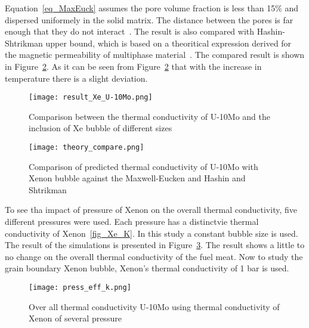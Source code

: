 \begin{doublespacing}
Equation~\ref{eq_MaxEuck} assumes the pore volume fraction is less than 15$\%$ and dispersed uniformely in the solid matrix. The distance between the pores is far enough that they do not interact~\cite{clark2003monolithic,smith2013thermal}. The result is also compared with  Hashin-Shtrikman upper bound, which is based on a theoritical expression derived for the magnetic permeability of multiphase material~\cite{hashin1962variational}. The compared result is shown in Figure~\ref{fig_compare}. As it can be seen from Figure~\ref{fig_compare} that with the increase in temperature there is a slight deviation.

\begin{figure}[H]
\centering
\texttt{[image: result\_Xe\_U-10Mo.png]}
\caption{Comparison between the thermal conductivity of U-10Mo and the inclusion of Xe bubble of different sizes}
\label{fig_result}
\end{figure}

\iffalse
FEM calculations were performed on \ref{fcc_mesh} in order to calculate the thermal flux and the thermal conductivity in 2D. Since thermal conductivity of Xenon is a function of both temperature and pressure, six different pressure has been chosen to represend the conductivity (Figure~\ref{fig_Xe_K}). Eventhough the dependence of thermal conductivity is evident, the results show no change in the overall thermal conductivity in the fuel. Pressure in the bubble is significantly higher than the 1000 bar in some situation~\cite{xiao2015atomistic}. The increased pressure inside the bubble creates another probability of having phase change from gas to solid~\cite{zheng2014thermodynamics}. So the resluts show that with the increased pressure inside the Xenon bubble, the overall thermal conductivity has a very negligible effect. 
\fi

\begin{figure}[H]
	\centering
	\texttt{[image: theory\_compare.png]}
	\caption{Comparison of predicted thermal conductivity of U-10Mo with Xenon bubble against the Maxwell-Eucken and Hashin and Shtrikman }
	\label{fig_compare}
	\end{figure}
To see tha impact of pressure of Xenon on the overall thermal conductivity, five different pressures were used. Each pressure has a distinctvie thermal conductivity of Xenon~\ref{fig_Xe_K}. In this study a constant bubble size is used. The result of the simulations is presented in Figure~\ref{fig_press_K}. The result shows a little to no change on the overall thermal conductivity of the fuel meat. Now to study the grain boundary Xenon bubble, Xenon's thermal conductivity of 1 bar is used.


\begin{figure}[H]
	\centering
	\texttt{[image: press\_eff\_k.png]}
	\caption{Over all thermal conductivity U-10Mo using thermal conductivity of Xenon of several pressure}
	\label{fig_press_K}
	
\end{figure}




\end{doublespacing}
